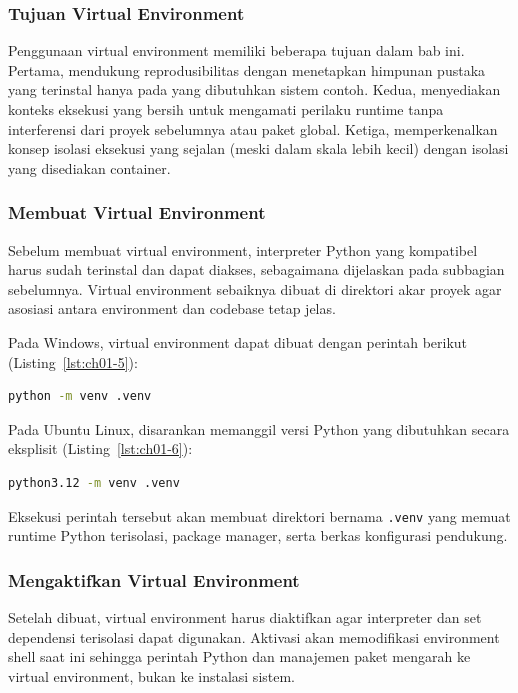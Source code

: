 \subsubsection{Tujuan Virtual Environment}

Penggunaan virtual environment memiliki beberapa tujuan dalam bab ini. Pertama,
mendukung reprodusibilitas dengan menetapkan himpunan pustaka yang terinstal
hanya pada yang dibutuhkan sistem contoh. Kedua, menyediakan konteks eksekusi
yang bersih untuk mengamati perilaku runtime tanpa interferensi dari proyek
sebelumnya atau paket global. Ketiga, memperkenalkan konsep isolasi eksekusi yang
sejalan (meski dalam skala lebih kecil) dengan isolasi yang disediakan container.

\subsubsection{Membuat Virtual Environment}

Sebelum membuat virtual environment, interpreter Python yang kompatibel harus
sudah terinstal dan dapat diakses, sebagaimana dijelaskan pada subbagian
sebelumnya. Virtual environment sebaiknya dibuat di direktori akar proyek agar
asosiasi antara environment dan codebase tetap jelas.

Pada Windows, virtual environment dapat dibuat dengan perintah berikut (Listing~\ref{lst:ch01-5}):

\begin{lstlisting}[language=bash, caption={Membuat virtual environment}, label={lst:ch01-5}]
python -m venv .venv
\end{lstlisting}

Pada Ubuntu Linux, disarankan memanggil versi Python yang dibutuhkan secara
eksplisit (Listing~\ref{lst:ch01-6}):

\begin{lstlisting}[language=bash, caption={Membuat virtual environment (2)}, label={lst:ch01-6}]
python3.12 -m venv .venv
\end{lstlisting}

Eksekusi perintah tersebut akan membuat direktori bernama \texttt{.venv} yang
memuat runtime Python terisolasi, package manager, serta berkas konfigurasi
pendukung.

\subsubsection{Mengaktifkan Virtual Environment}

Setelah dibuat, virtual environment harus diaktifkan agar interpreter dan set
dependensi terisolasi dapat digunakan. Aktivasi akan memodifikasi environment
shell saat ini sehingga perintah Python dan manajemen paket mengarah ke virtual
environment, bukan ke instalasi sistem.

